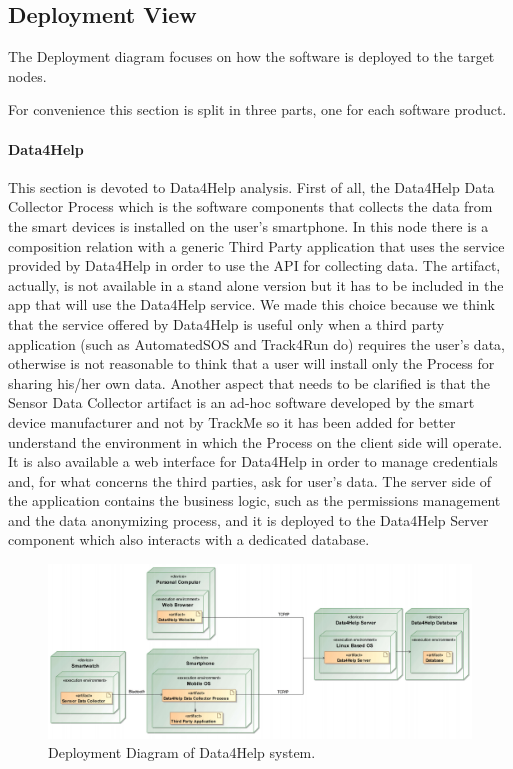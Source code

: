 \documentclass[a4paper]{article}
\begin{document}
\subsection{Deployment View}
The Deployment diagram focuses on how the software is deployed to the target nodes.

For convenience this section is split in three parts, one for each software product.

\paragraph{Data4Help}
This section is devoted to Data4Help analysis. First of all, the Data4Help Data Collector Process which is the software components that collects the data from the smart devices is installed on the user's smartphone. In this node there is a composition relation with a generic Third Party application that uses the service provided by Data4Help in order to use the API for collecting data. The artifact, actually, is not available in a stand alone version but it has to be included in the app that will use the Data4Help service. We made this choice because we think that the service offered by Data4Help is useful only when a third party application (such as AutomatedSOS and Track4Run do) requires the user's data, otherwise is not reasonable to think that a user will install only the Process for sharing his/her own data.
Another aspect that needs to be clarified is that the Sensor Data Collector artifact is an ad-hoc software developed by the smart device manufacturer and not by TrackMe so it has been added for better understand the environment in which the Process on the client side will operate.
It is also available a web interface for Data4Help in order to manage credentials and, for what concerns the third parties, ask for user's data.
The server side of the application contains the business logic, such as the permissions management and the data anonymizing process, and it is deployed to the Data4Help Server component which also interacts with a dedicated database.

\begin{figure}[H]
    \centering
    \includegraphics[width=\linewidth]{deploymentDiagram-Data4Help}
    \caption{Deployment Diagram of Data4Help system.}
    \label{fig:my_label}
\end{figure}
\end{document}
